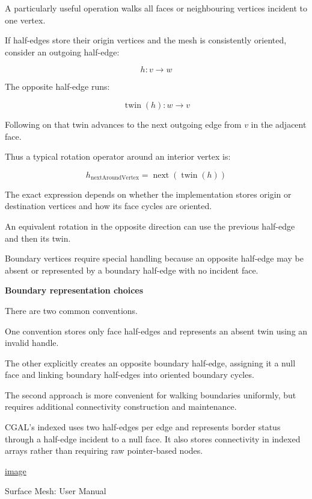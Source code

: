 A particularly useful operation walks all faces or neighbouring vertices incident to one vertex.

If half-edges store their origin vertices and the mesh is consistently oriented, consider an outgoing half-edge:

\[
h:v\rightarrow w
\]

The opposite half-edge runs:

\[
\operatorname{twin}(h):w\rightarrow v
\]

Following  on that twin advances to the next outgoing edge from \(v\) in the adjacent face.

Thus a typical rotation operator around an interior vertex is:

\[
\boxed{ h_{\mathrm{nextAroundVertex}} = \operatorname{next}(\operatorname{twin}(h)) }
\]

The exact expression depends on whether the implementation stores origin or destination vertices and how its face cycles are oriented.

An equivalent rotation in the opposite direction can use the previous half-edge and then its twin.

Boundary vertices require special handling because an opposite half-edge may be absent or represented by a boundary half-edge with no incident face.

\textbf{Boundary representation choices}

There are two common conventions.

One convention stores only face half-edges and represents an absent twin using an invalid handle.

The other explicitly creates an opposite boundary half-edge, assigning it a null face and linking boundary half-edges into oriented boundary cycles.

The second approach is more convenient for walking boundaries uniformly, but requires additional connectivity construction and maintenance.

CGAL's indexed  uses two half-edges per edge and represents border status through a half-edge incident to a null face. It also stores connectivity in indexed arrays rather than requiring raw pointer-based nodes. 

\href{https://www.google.com/s2/favicons?domain=https://doc.cgal.org&sz=32}{image}

Surface Mesh: User Manual

